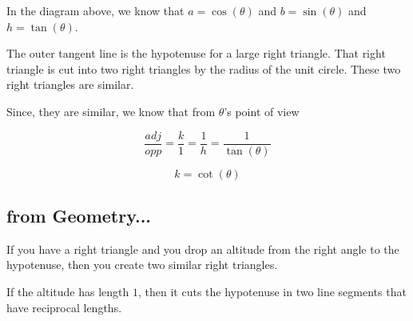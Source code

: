 \documentclass{ximera}
\begin{document}
\begin{image}
\end{image}



In the diagram above, we know that $a = \cos(\theta)$ and $b = \sin(\theta)$ and $h = \tan(\theta)$.


The outer tangent line is the hypotenuse for a large right triangle.  That right triangle is cut into two right triangles by the radius of the unit circle.  These two right triangles are similar.






Since, they are similar, we know that from $\theta$'s point of view


\[    \frac{adj}{opp} = \frac{k}{1}   = \frac{1}{h}     = \frac{1}{\tan(\theta)}       \]


\[         k = \cot(\theta)\]










\subsection*{from Geometry...}


If you have a right triangle and you drop an altitude from the right angle to the hypotenuse, then you create two similar right triangles.

If the altitude has length $1$, then it cuts the hypotenuse in two line segments that have reciprocal lengths.
\end{document}
